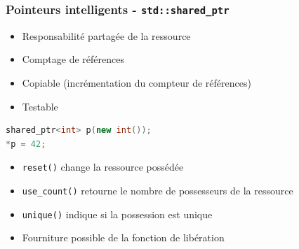 \documentclass[C++.tex]{subfiles}
\begin{document}
\begin{frame}[fragile]
	\frametitle{Pointeurs intelligents - \lstinline|std::shared_ptr|}
	\begin{itemize}
		\item Responsabilité partagée de la ressource
		\item Comptage de références
		\item Copiable (incrémentation du compteur de références)
		\item Testable
	\end{itemize}

	\begin{lstlisting}[language=C++]
shared_ptr<int> p(new int());
*p = 42;\end{lstlisting}

	\begin{itemize}
		\item \lstinline|reset()| change la ressource possédée


		\item \lstinline|use_count()| retourne le nombre de possesseurs de la ressource
		\item \lstinline|unique()| indique si la possession est unique
		\item Fourniture possible de la fonction de libération
	\end{itemize}
\end{frame}
\end{document}
